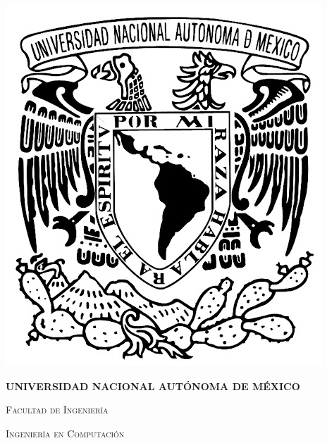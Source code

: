 \documentclass[12pt,letterpaper]{article}
\begin{document}
	\begin{titlepage}
		\centering
		\begin{minipage}{0.14\linewidth}
			\includegraphics[width=\linewidth]{img/shieldUnam}
		\end{minipage}
		\begin{minipage}{0.7\linewidth}
			\centering
			{\bfseries\large UNIVERSIDAD NACIONAL AUTÓNOMA DE MÉXICO \par}
			\vfill
			{\scshape\Large Facultad de Ingeniería \par}
			\vfill
			{\scshape\Large Ingeniería en Computación \par}
		\end{minipage}
		\begin{minipage}{0.14\linewidth}

\end{minipage}
\end{titlepage}
\end{document}
